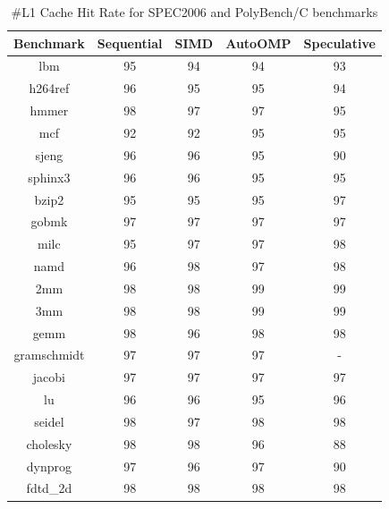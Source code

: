 \documentclass[10pt]{report}          %
\begin{document}
\begin{table}
\centering
\caption{\#L1 Cache Hit Rate for SPEC2006 and PolyBench/C benchmarks}
\begin{tabular}{|c||c|c|c|c|} \hline
Benchmark &Sequential & SIMD & AutoOMP & Speculative\\ \hline 
lbm & 95 & 94 & 94 & 93\\ \hline
h264ref & 96 & 95 & 95 & 94 \\ \hline
hmmer &	98 & 97 & 97 & 95  \\ \hline
mcf & 92 & 92 & 95 & 95 \\ \hline
sjeng &	96 & 96 & 95 & 90 \\ \hline
sphinx3 & 96 & 96 & 95 & 95  \\ \hline
bzip2 & 95 & 95 & 95 & 97  \\ \hline
gobmk & 97 & 97 & 97 & 97  \\ \hline
milc & 95 & 97 & 97 & 98  \\ \hline
namd & 96 & 98 & 97 & 98  \\ \hline
2mm	& 98 & 98 & 99 & 99 \\ \hline
3mm	& 98 & 98 & 99 & 99 \\ \hline
gemm	 & 98 & 96 & 98 & 98\\ \hline
gramschmidt	& 97 & 97 & 97 & - \\ \hline
jacobi & 97& 97 & 97 & 97 \\ \hline
lu	& 96 & 96 & 95 & 96 \\ \hline
seidel&	98 & 97 & 98 & 98 \\ \hline
cholesky & 98 & 98 & 96 & 88\\ \hline
dynprog & 97 & 96 & 97 & 90\\ \hline
fdtd\_2d & 98 & 98 & 98 & 98 \\ \hline
\hline\end{tabular}
\label{table:cache}
\end{table}
\end{document}
